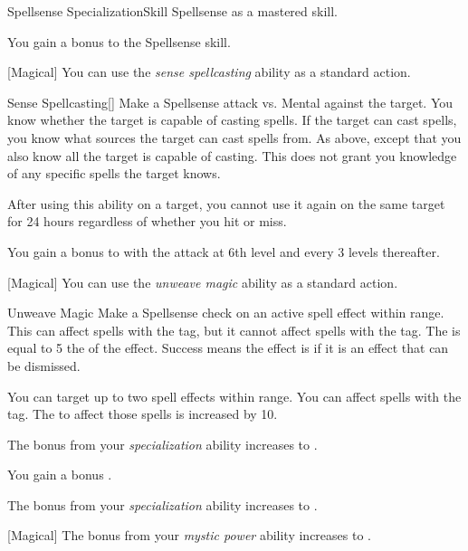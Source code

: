     \begin{feat}{Spellsense Specialization}{Skill}
        \featpre Spellsense as a mastered skill.

         You gain a  bonus to the Spellsense skill.

        [Magical] You can use the \textit{sense spellcasting} ability as a standard action.
        \begin{freeability}{Sense Spellcasting}[]
            Make a Spellsense attack vs. Mental against the target.
            \hit You know whether the target is capable of casting spells.
            If the target can cast spells, you know what sources the target can cast spells from.
            \crit As above, except that you also know all  the target is capable of casting.
            This does not grant you knowledge of any specific spells the target knows.

            After using this ability on a target, you cannot use it again on the same target for 24 hours regardless of whether you hit or miss.

            \rankline
            You gain a  bonus to  with the attack at 6th level and every 3 levels thereafter.
        \end{freeability}

        [Magical] You can use the \textit{unweave magic} ability as a standard action.
        \begin{freeability}{Unweave Magic}
            Make a Spellsense check on an active spell effect within \rngmed range.
            This can affect spells with the  tag, but it cannot affect spells with the  tag.
            The  is equal to 5 \add the  of the effect.
            Success means the effect is  if it is an effect that can be dismissed.

            \rankline
             You can target up to two spell effects within range.
             You can affect spells with the  tag.
            The  to affect those spells is increased by 10.
        \end{freeability}

         The bonus from your \textit{specialization} ability increases to .

         You gain a  bonus  .

         The bonus from your \textit{specialization} ability increases to .

        [Magical] The bonus from your \textit{mystic power} ability increases to .
    \end{feat}

